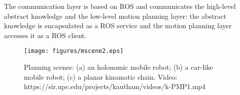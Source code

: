 \documentclass[twocolumn]{svjour3}          %
\begin{document}
The communication layer is based on ROS and communicates the high-level abstract knowledge and the low-level motion planning layer: the abstract knowledge is encapsulated as a ROS service and the motion planning layer accesses it as a ROS client.
\begin{figure*}[h]
\begin{center}
   \texttt{[image: figures/mscene2.eps]}
   \caption{Planning scenes: (a) an holonomic mobile robot; (b) a car-like mobile robot; (c) a planar kinamatic chain. Video: 
https://sir.upc.edu/projects/kautham/videos/k-PMP1.mp4}\label{fig:scenes}
\end{center}
\end{figure*}

\end{document}
